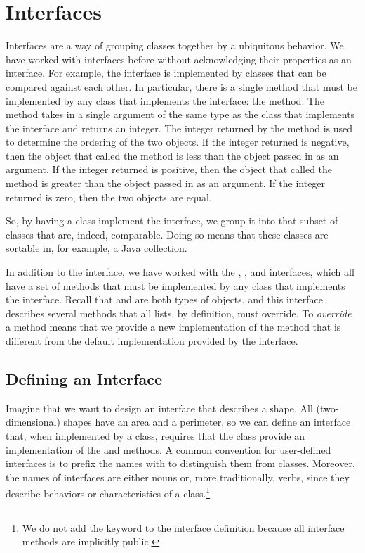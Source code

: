 \section{Interfaces}

Interfaces are a way of grouping classes together by a ubiquitous behavior. We have worked with interfaces before without acknowledging their properties as an interface. For example, the  interface is implemented by classes that can be compared against each other. In particular, there is a single method that must be implemented by any class that implements the  interface: the  method. The  method takes in a single argument of the same type as the class that implements the  interface and returns an integer. The integer returned by the  method is used to determine the ordering of the two objects. If the integer returned is negative, then the object that called the  method is less than the object passed in as an argument. If the integer returned is positive, then the object that called the  method is greater than the object passed in as an argument. If the integer returned is zero, then the two objects are equal.

So, by having a class implement the  interface, we group it into that subset of classes that are, indeed, comparable. Doing so means that these classes are sortable in, for example, a Java collection. 

In addition to the  interface, we have worked with the , , and  interfaces, which all have a set of methods that must be implemented by any class that implements the interface. Recall that  and  are both types of  objects, and this interface describes several methods that all lists, by definition, must override. To \textit{override} a method means that we provide a new implementation of the method that is different from the default implementation provided by the interface.

\subsection*{Defining an Interface}
\example Imagine that we want to design an interface that describes a shape. All (two-dimensional) shapes have an area and a perimeter, so we can define an interface that, when implemented by a class, requires that the class provide an implementation of the  and  methods. A common convention for user-defined interfaces is to prefix the names with  to distinguish them from classes. Moreover, the names of interfaces are either nouns or, more traditionally, verbs, since they describe behaviors or characteristics of a class.\footnote{We do not add the  keyword to the interface definition because all interface methods are implicitly public.}

